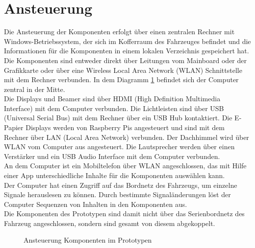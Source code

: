 \section{Ansteuerung}
Die Ansteuerung der Komponenten erfolgt über einen zentralen Rechner mit Windows-Betriebssystem, der sich im Kofferraum des Fahrzeuges befindet und die Informationen für die Komponenten in einem lokalen Verzeichnis gespeichert hat. Die Komponenten sind entweder direkt über Leitungen vom Mainboard oder der Grafikkarte oder über eine Wireless Local Area Network (WLAN) Schnittstelle mit dem Rechner verbunden. In dem Diagramm \ref{fig:tikz_ansteuerung} befindet sich der Computer zentral in der Mitte.\\
Die Displays und Beamer sind über HDMI (High Definition Multimedia Interface) mit dem Computer verbunden. Die Lichtleisten sind über USB (Universal Serial Bus) mit dem Rechner über ein USB Hub kontaktiert. Die E-Papier Displays werden von Raspberry Pis angesteuert und sind mit dem Rechner über LAN (Local Area Network) verbunden. Der Dachhimmel wird über WLAN vom Computer aus angesteuert. Die Lautsprecher werden über einen Verstärker und ein USB Audio Interface mit dem Computer verbunden.\\
An dem Computer ist ein Mobiltelefon über WLAN angeschlossen, das mit Hilfe einer App unterschiedliche Inhalte für die Komponenten auswählen kann.\\
Der Computer hat einen Zugriff auf das Bordnetz des Fahrzeugs, um einzelne Signale herauslesen zu können. Durch bestimmte Signaländerungen löst der Computer Sequenzen von Inhalten in den Komponenten aus.\\
Die Komponenten des Prototypen sind damit nicht über das Serienbordnetz des Fahrzeug angeschlossen, sondern sind gesamt von diesem abgekoppelt.
\begin{figure}[hbt]
	\centering
	
	\caption[Ansteuerung Komponenten im Prototypen]{Ansteuerung Komponenten im Prototypen}
	\label{fig:tikz_ansteuerung}
\end{figure}